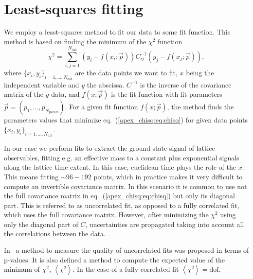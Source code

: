 
\chapter{Least-squares fitting}
\label{apex_chisq}

We employ a least-squares method to fit our data to some fit function. This method is based on finding the  minimum of the $\chi^2$ function
\begin{equation}
\label{apex_chisq:eq:chisq}
\chi^2=\sum_{i,j=1}^{N_{\textrm{dat}}}\left(y_i-f(x_i;\vec{p})\right)C_{ij}^{-1}\left(y_j-f(x_j;\vec{p})\right),
\end{equation}
where $\{x_i,y_i\}_{i=1,...,N_{\textrm{dat}}}$ are the data points we want to fit, $x$ being the independent variable and $y$ the abscissa. $C^{-1}$ is the inverse of the covariance matrix of the $y$-data, and $f(x;\vec{p})$ is the fit function with fit parameters $\vec{p}=(p_1,...,p_{N_{\textrm{param}}})$. For a given fit function $f(x;\vec{p})$, the method finds the parameters values that minimize eq.~(\ref{apex_chisq:eq:chisq}) for given data points $\{x_i,y_i\}_{i=1,...,N_{\textrm{dat}}}$.

In our case we perform fits to extract the ground state signal of lattice observables, fitting e.g. an effective mass to a constant plus exponential signals along the lattice time extent. In this case, euclidean time plays the role of the $x$. This means fitting $\sim96-192$ points, which in practice makes it very difficult to compute an invertible covariance matrix. In this scenario it is common to use not the full covariance matrix in eq.~(\ref{apex_chisq:eq:chisq}) but only its diagonal part. This is referred to as uncorrelated fit, as opposed to a fully correlated fit, which uses the full covariance matrix. However, after minimizing the $\chi^2$ using only the diagonal part of $C$, uncertainties are propagated taking into account all the correlations between the data.

In~\citep{Bruno:2022mfy} a method to measure the quality of uncorrelated fits was proposed in terms of p-values. It is also defined a method to compute the expected value of the minimum of $\chi^2$, $\left<\chi^2\right>$. In the case of a fully correlated fit $\left<\chi^2\right>={\textrm{dof}}$.

